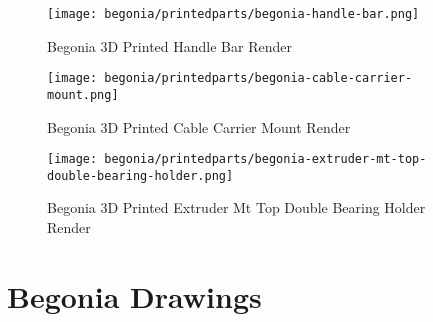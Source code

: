 \begin{figure}[H]
\centering
\texttt{[image: begonia/printedparts/begonia-handle-bar.png]}
\caption{Begonia 3D Printed Handle Bar Render}
\label{fig:beghandlebar}
\end{figure}

\begin{figure}[H]
\centering
\texttt{[image: begonia/printedparts/begonia-cable-carrier-mount.png]}
\caption{Begonia 3D Printed Cable Carrier Mount Render}
\label{fig:begcablecarriermount}
\end{figure}

\begin{figure}[H]
\centering
\texttt{[image: begonia/printedparts/begonia-extruder-mt-top-double-bearing-holder.png]}
\caption{Begonia 3D Printed Extruder Mt Top Double Bearing Holder Render}
\label{fig:begextrudermttop}
\end{figure}


\section{Begonia Drawings}








